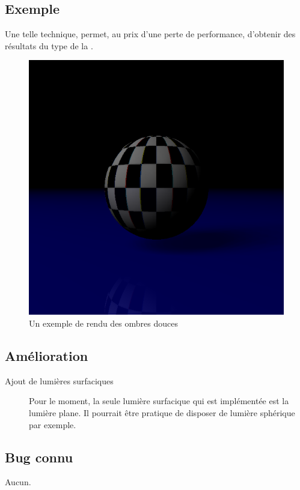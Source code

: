 \subsection{Exemple}
Une telle technique, permet, au prix d'une perte de performance, d'obtenir des
résultats du type de la .

\begin{figure}[h]
  \includegraphics[width=\textwidth, keepaspectratio=true]{../../diary/21.png}
  \caption{Un exemple de rendu des ombres douces\label{fig:softshadows}}
\end{figure}

\subsection{Amélioration}
\begin{description}
  \item [Ajout de lumières surfaciques] Pour le moment, la seule lumière
    surfacique qui est implémentée est la lumière plane. Il pourrait être
    pratique de disposer de lumière sphérique par exemple.
\end{description}

\subsection{Bug connu}
Aucun.
